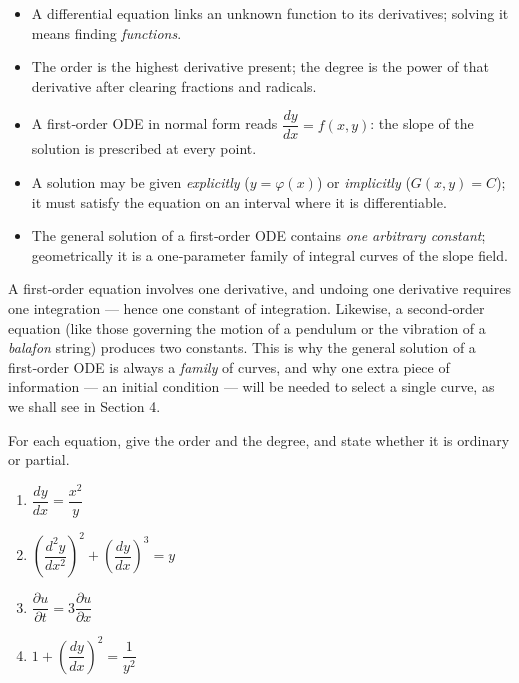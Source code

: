 \documentclass[11pt]{article}
\newcommand{\cle}[1]{{\popxbold\color{popdark}#1}}
\begin{document}
\begin{aretenir}
\begin{itemize}
\item A differential equation links an unknown function to its derivatives; solving it means finding \emph{functions}.
\item The \cle{order} is the highest derivative present; the \cle{degree} is the power of that derivative after clearing fractions and radicals.
\item A first‑order ODE in normal form reads $\dfrac{dy}{dx} = f(x,y)$: the slope of the solution is prescribed at every point.
\item A solution may be given \emph{explicitly} ($y = \varphi(x)$) or \emph{implicitly} ($G(x,y) = C$); it must satisfy the equation on an interval where it is differentiable.
\item The general solution of a first‑order ODE contains \emph{one arbitrary constant}; geometrically it is a one‑parameter family of integral curves of the slope field.
\end{itemize}
\end{aretenir}

\begin{savaistu}
A first‑order equation involves one derivative, and undoing one derivative requires one integration — hence one constant of integration. Likewise, a second‑order equation (like those governing the motion of a pendulum or the vibration of a \emph{balafon} string) produces two constants. This is why the general solution of a first‑order ODE is always a \emph{family} of curves, and why one extra piece of information — an initial condition — will be needed to select a single curve, as we shall see in Section 4.
\end{savaistu}

\begin{exercice}
For each equation, give the order and the degree, and state whether it is ordinary or partial.
\begin{enumerate}
\item $\dfrac{dy}{dx} = \dfrac{x^{2}}{y}$
\item $\left(\dfrac{d^{2}y}{dx^{2}}\right)^{2} + \left(\dfrac{dy}{dx}\right)^{3} = y$
\item $\dfrac{\partial u}{\partial t} = 3\dfrac{\partial u}{\partial x}$
\item $1 + \left(\dfrac{dy}{dx}\right)^{2} = \dfrac{1}{y^{2}}$
\end{enumerate}
\end{exercice}
\end{document}
